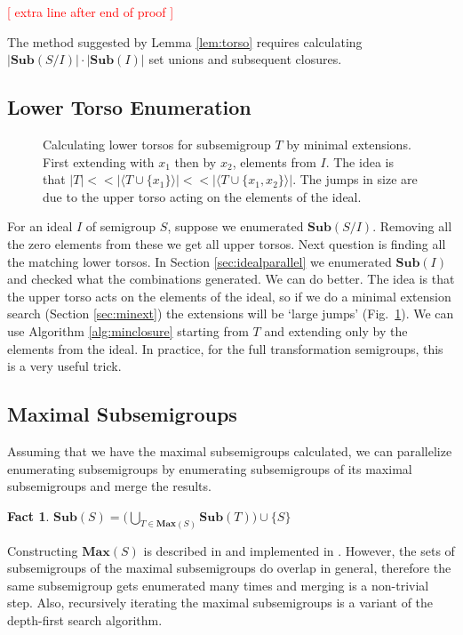 \documentclass{amsart}
\newcommand{\Sub}{\mathbf{Sub}}
\newcommand{\Max}{\mathbf{Max}}
\newcommand{\todo}[1]{\textcolor{red}{ \small \textsf{[ #1 ]} \normalsize}}
\theoremstyle{plain}
\newtheorem{fact}[theorem]{Fact}
\theoremstyle{definition}
\begin{document}
\todo{extra line after end of proof}

The method suggested by Lemma \ref{lem:torso} requires calculating $|\Sub(S/I)|\cdot|\Sub(I)|$ set unions and subsequent closures. 
\subsection{Lower Torso Enumeration}
\label{sec:lowertorso}
\begin{figure}

\caption{Calculating lower torsos for subsemigroup $T$ by minimal extensions. First extending with $x_1$ then by $x_2$, elements from $I$. The idea is that $|T| << |\langle T\cup\{x_1\}\rangle| << |\langle T\cup\{x_1,x_2\}\rangle|$. The jumps in size are due to the upper torso acting on the elements of the ideal.}
\label{fig:lowertorsoenum}
\end{figure}
For an ideal $I$ of semigroup $S$, suppose we enumerated $\Sub(S/I)$.
Removing all the zero elements from these we get all upper torsos.
Next question is finding all the matching lower torsos.
In Section \ref{sec:idealparallel} we enumerated $\Sub(I)$ and checked what the combinations generated.
We can do better.
The idea is that the upper torso acts on the elements of the ideal, so if we do a minimal extension search (Section \ref{sec:minext}) the extensions will be `large jumps' (Fig.~\ref{fig:lowertorsoenum}).
We can use Algorithm \ref{alg:minclosure} starting from $T$ and extending only by the elements from the ideal. %
In practice, for the full transformation semigroups, this is a very useful trick.

\subsection{Maximal Subsemigroups}
Assuming that we have the maximal subsemigroups calculated, we can parallelize enumerating subsemigroups by enumerating subsemigroups of its maximal subsemigroups and merge the results.
\begin{fact}
$\Sub(S)=\big( \bigcup_{T\in \Max(S)}\Sub(T)\big)\cup \{S\}$
\end{fact}
\noindent Constructing $\Max(S)$ is described in \cite{MaxSubSemi} and implemented in \cite{Semigroups}.
However, the sets of subsemigroups of the maximal subsemigroups do overlap in general, therefore the same subsemigroup gets enumerated many times and merging is a non-trivial step.
Also, recursively iterating the maximal subsemigroups is a variant of the depth-first search algorithm.  
\end{document}
